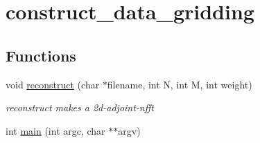\hypertarget{group__applications__mri2d__construct__data__gridding}{
\section{construct\_\-data\_\-gridding}
\label{group__applications__mri2d__construct__data__gridding}
}
\subsection*{Functions}
\begin{CompactItemize}
\item 
\hypertarget{group__applications__mri2d__construct__data__gridding_g5e388b0c3f42cf3fcb1e5596fde5e059}{
void \hyperlink{group__applications__mri2d__construct__data__gridding_g5e388b0c3f42cf3fcb1e5596fde5e059}{reconstruct} (char $\ast$filename, int N, int M, int weight)}
\label{group__applications__mri2d__construct__data__gridding_g5e388b0c3f42cf3fcb1e5596fde5e059}

\begin{CompactList}\small\item\em reconstruct makes a 2d-adjoint-nfft \item\end{CompactList}\item 
\hypertarget{group__applications__mri2d__construct__data__gridding_g3c04138a5bfe5d72780bb7e82a18e627}{
int \hyperlink{group__applications__mri2d__construct__data__gridding_g3c04138a5bfe5d72780bb7e82a18e627}{main} (int argc, char $\ast$$\ast$argv)}
\label{group__applications__mri2d__construct__data__gridding_g3c04138a5bfe5d72780bb7e82a18e627}

\end{CompactItemize}
